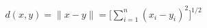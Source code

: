 \documentclass[preview]{standalone}
\begin{document}
\begin{align*}
d(x,y) = \lVert x-y \rVert = \Biggl\lbrack \sum_{i=1}^{n} (x_{i}-y_{i})^{2} \Biggr\rbrack ^{1/2}
\end{align*}
\end{document}
